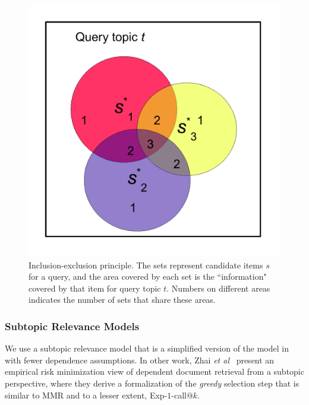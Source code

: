 \begin{figure}[t!]
\begin{center}
\centerline{\includegraphics[scale = 0.4]{inclusionExclusionPrinciple}}
\caption[Inclusion-exclusion principle.]{Inclusion-exclusion principle. The sets represent candidate
items $s$ for a query, and the area covered by each set is the
``information" covered by that item for query topic $t$. Numbers on different areas
indicates the number of sets that share these areas. }
\label{fig:inclusionExclusionPrinciple}
\end{center}
\end{figure}

\subsubsection{Subtopic Relevance Models} 
We use a subtopic relevance
model that is a simplified version of the model in~\cite{plmmr} with
fewer dependence assumptions.  In other work, Zhai {\it et
al}~\cite{zhai03Beyond} present an empirical risk minimization view of
dependent document retrieval from a subtopic perspective,
where they derive a formalization of the
\emph{greedy} selection step that is similar to MMR and to a lesser
extent, Exp-$1$-call@$k$.

